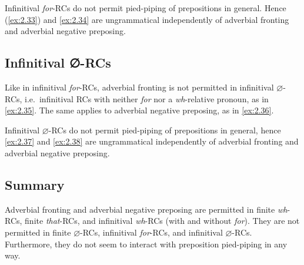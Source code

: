 \documentclass[output=paper]{langsci/langscibook}
\begin{document}
\ea\label{ex:2.31}
    \z
\ex\label{ex:2.32}
    \z
\z
Infinitival \emph{for}-\glspl{RC} do not permit pied-piping of prepositions in
general. Hence (\ref{ex:2.33}) and \eqref{ex:2.34} are ungrammatical independently of adverbial
fronting and adverbial negative preposing.
\judgewidth{*}

\label{ex:2.33}
\label{ex:2.34}
\z

\subsection{Infinitival ∅-RCs}

Like in infinitival \emph{for}{-RCs, adverbial fronting is not permitted in
infinitival} $\varnothing${-RCs, i.e.\ infinitival \glspl{RC} with neither} \emph{for} nor
a \emph{wh}{-relative pronoun}, as in \eqref{ex:2.35}. The same applies to adverbial
negative preposing, as in \eqref{ex:2.36}.

\label{ex:2.35}
\label{ex:2.36}
\z
Infinitival $\varnothing${-\glspl{RC} do not permit pied-pi}ping of prepositions in
general, hence \eqref{ex:2.37} and \eqref{ex:2.38} are ungrammatical independently of adverbial
fronting and adverbial negative preposing.

\label{ex:2.37}
\label{ex:2.38}
\z

\subsection{Summary}

Adverbial fronting and adverbial negative preposing are permitted in finite
\emph{wh}{-RCs, finite} \emph{that}{-RCs, and infinitival} \emph{wh}{-\glspl{RC} (with
and without} \emph{for}). They are not permitted in finite $\varnothing${-RCs,
infinitival} \emph{for}{-RCs, and infinitival} $\varnothing${-RCs. Furthermore,}
they do not seem to interact with preposition pied-piping in any way.
\end{document}
